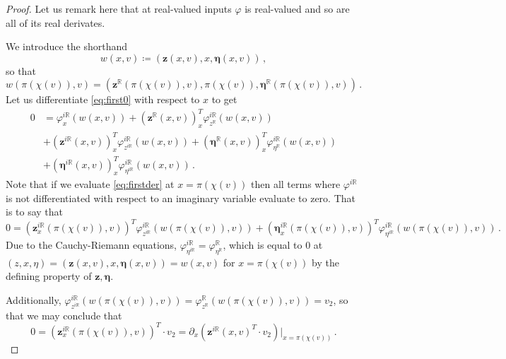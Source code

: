 \documentclass[
	fontsize=11pt, 
	twoside=false, 
	abstract=true, 
	a4paper,
]{scrartcl}
\newcommand{\RR}{\mathbb{R}}
\newcommand{\del}{\partial}
\begin{document}
\begin{proof}
	Let us remark here that at real-valued inputs $\varphi$ is real-valued and so are all of its real derivates.

	We introduce the shorthand
	\[
		w(x,v) \coloneqq (\mathbf{z}(x,v),x,\bm{\eta}(x,v))\,,
	\]
	so that 
	\[
		w(\pi(\chi(v)),v) = (\mathbf{z}^{\RR}(\pi(\chi(v)),v),\pi(\chi(v)),\bm{\eta}^{\RR}(\pi(\chi(v)),v))\,.
	\]
	Let us differentiate \cref{eq:first0} with respect to $x$ to get
	\begin{equation}
	\begin{aligned}\label{eq:firstder}
		0 &= \varphi^{i\RR}_x(w(x,v)) + (\mathbf{z}^{\RR}(x,v))_x^T\varphi^{i\RR}_{z^{\RR}}(w(x,v)) \\ 
		  &+ (\mathbf{z}^{i\RR}(x,v))_x^T\varphi^{i\RR}_{z^{i\RR}}(w(x,v)) + (\bm{\eta}^{\RR}(x,v))_x^T\varphi^{i\RR}_{\eta^{\RR}}(w(x,v))\\
		  &+(\bm{\eta}^{i\RR}(x,v))^T_x\varphi^{i\RR}_{\eta^{i\RR}}(w(x,v))\,.
	\end{aligned}
\end{equation}
	Note that if we evaluate \cref{eq:firstder} at $x=\pi(\chi(v))$ then all terms where $\varphi^{i\RR}$ is not differentiated with respect to an imaginary variable evaluate to zero. That is to say that 
	\[
		0 = (\mathbf{z}^{i\RR}_x(\pi(\chi(v)),v))^T\varphi^{i\RR}_{z^{i\RR}}(w(\pi(\chi(v)),v)) 
		+ (\bm{\eta}^{i\RR}_x(\pi(\chi(v)),v))^T\varphi^{i\RR}_{\eta^{i\RR}}(w(\pi(\chi(v)),v))\,.
	\] 
	Due to the Cauchy-Riemann equations, $\varphi^{i\RR}_{\eta^{i\RR}} = \varphi^{\RR}_{\eta^{\RR}}$, which is equal to $0$ at $(z,x,\eta) = (\mathbf{z}(x,v),x,\bm{\eta}(x,v)) = w(x,v)$ for $x=\pi(\chi(v))$ by the defining property of $\mathbf{z},\bm{\eta}$.

	Additionally, $\varphi^{i\RR}_{z^{i\RR}}(w(\pi(\chi(v)),v)) = \varphi^{\RR}_{z^{\RR}}(w(\pi(\chi(v)),v)) = v_2$, so that we may conclude that 
	\begin{equation}\label{eq:Zir0}
		0 = (\mathbf{z}^{i\RR}_x(\pi(\chi(v)),v))^T\cdot v_2 = \del_x\left(\mathbf{z}^{i\RR}(x,v)^T\cdot v_2\right)\vert_{x=\pi(\chi(v))}\,.
	\end{equation}


\end{proof}
\end{document}
